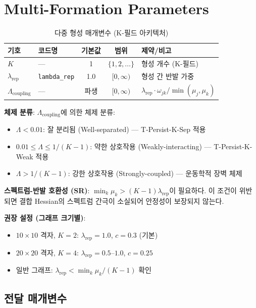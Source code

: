 \section{Multi-Formation Parameters}
\label{app:multi-params}

\begin{table}[h]
\centering
\caption{다중 형성 매개변수 (K-필드 아키텍처)}
\label{tab:multi-params}
\begin{tabular}{llccp{5cm}}
\hline
\textbf{기호} & \textbf{코드명} & \textbf{기본값} & \textbf{범위} & \textbf{제약/비고} \\
\hline
$K$ & --- & 1 & $\{1,2,\ldots\}$ & 형성 개수 (K-필드) \\
$\lambda_{\mathrm{rep}}$ & \texttt{lambda\_rep} & 1.0 & $[0, \infty)$ & 형성 간 반발 가중 \\
$\Lambda_{\mathrm{coupling}}$ & --- & 파생 & $[0, \infty)$ & $\lambda_{\mathrm{rep}} \cdot \omega_{jk}/\min(\mu_j, \mu_k)$ \\
\hline
\end{tabular}
\end{table}

\textbf{체제 분류}: $\Lambda_{\mathrm{coupling}}$에 의한 체제 분류:
\begin{itemize}
    \item $\Lambda < 0.01$: 잘 분리됨 (Well-separated) --- T-Persist-K-Sep 적용
    \item $0.01 \leq \Lambda \leq 1/(K{-}1)$: 약한 상호작용 (Weakly-interacting) --- T-Persist-K-Weak 적용
    \item $\Lambda > 1/(K{-}1)$: 강한 상호작용 (Strongly-coupled) --- 운동학적 장벽 체제
\end{itemize}

\textbf{스펙트럼-반발 호환성 (SR)}: $\min_k \mu_k > (K{-}1)\lambda_{\mathrm{rep}}$이 필요하다. 이 조건이 위반되면 결합 Hessian의 스펙트럼 간극이 소실되어 안정성이 보장되지 않는다.

\textbf{권장 설정 (그래프 크기별)}:
\begin{itemize}
    \item $10 \times 10$ 격자, $K = 2$: $\lambda_{\mathrm{rep}} = 1.0$, $c = 0.3$ (기본)
    \item $20 \times 20$ 격자, $K = 4$: $\lambda_{\mathrm{rep}} = 0.5$--$1.0$, $c = 0.25$
    \item 일반 그래프: $\lambda_{\mathrm{rep}} < \min_k \mu_k / (K{-}1)$ 확인
\end{itemize}


\subsection{전달 매개변수}

